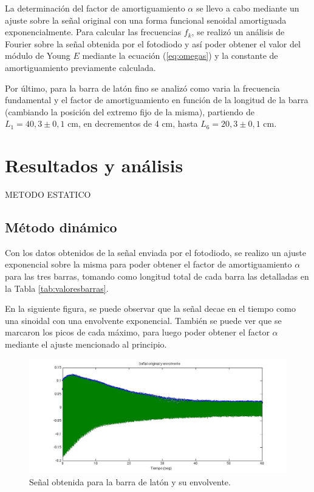 \documentclass[twoside,twocolumn,a4paper]{article}
\begin{document}
La determinaci\'on del factor de amortiguamiento $\alpha$ se llevo a cabo mediante un ajuste sobre la se\~nal original con una forma funcional senoidal amortiguada exponencialmente.
Para calcular las frecuencias $f_{k}$, se realiz\'o un an\'alisis de Fourier sobre la se\~nal obtenida por el fotodiodo y as\'i poder obtener el valor del m\'odulo de Young $E$ mediante la ecuaci\'on (\ref{eq:omegas}) y la constante de amortiguamiento previamente calculada.

Por \'ultimo, para la barra de lat\'on fino se analiz\'o como varia la frecuencia fundamental y el factor de amortiguamiento en funci\'on de la longitud de la barra (cambiando la posici\'on del extremo fijo de la misma), partiendo de $L_{1} = 40,3 \pm 0,1$ cm, en decrementos de 4 cm, hasta $L_{6} = 20,3 \pm 0,1$ cm.



\section{Resultados y an\'alisis}

METODO ESTATICO


\subsection{M\'etodo din\'amico}

Con los datos obtenidos de la se\~nal enviada por el fotodiodo, se realizo un ajuste exponencial sobre la misma para poder obtener el factor de amortiguamiento $\alpha$ para las tres barras, tomando como longitud total de cada barra las detalladas en la Tabla \ref{tab:valoresbarras}. \newline

En la siguiente figura, se puede observar que la se\~nal decae en el tiempo como una sinoidal con una envolvente exponencial. Tambi\'en se puede ver que se marcaron los picos de cada m\'aximo, para luego poder obtener el factor $\alpha$ mediante el ajuste mencionado al principio.

\begin{figure}[H]
\includegraphics[width=\linewidth]{senalenvolvente.jpg}
\caption{Se\~nal obtenida para la barra de lat\'on y su envolvente.}
\label{fig:senalenvolvente}
\end{figure}
\end{document}
